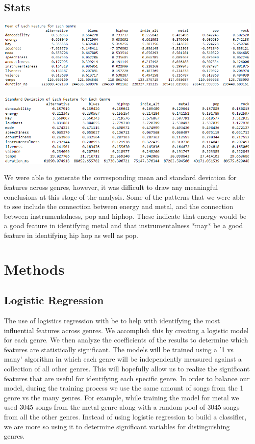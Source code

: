 \documentclass[11pt, a4paper, twocolumn]{article}
\begin{document}
\subsection{Stats}
\centerline{\includegraphics[scale=0.3]{Stats_Mean}}
\centerline{\includegraphics[scale=0.3]{Stats_SD}}
We were able to generate the corresponding mean and standard deviation for features across genres, however, it was difficult to draw any meaningful conclusions at this stage of the analysis. Some of the patterns that we were able to see include the connection between energy and metal, and the connection between instrumentalness, pop and hiphop. These indicate that energy would be a good feature in identifying metal and that instrumentalness *may* be a good feature in identifying hip hop as well as pop. 
\section{Methods}
\subsection{Logistic Regression}
The use of logistics regression with be to help with identifying the most influential features across genres. We accomplish this by creating a logistic model for each genre. We then analyze the coefficients of the results to determine which features are statistically significant. The models will be trained using a '1 vs many' algorithm in which each genre will be independently measured against a collection of all other genres. This will hopefully allow us to realize the significant features that are useful for identifying each specific genre. 
In order to balance our model, during the training process we use the same amount of songs from the 1 genre vs the many genres. For example, while training the model for metal we used 3045 songs from the metal genre along with a random pool of 3045 songs from all the other genres. Instead of using logistic regression to build a classifier, we are more so using it to determine significant variables for distinguishing genres. 
\end{document}
